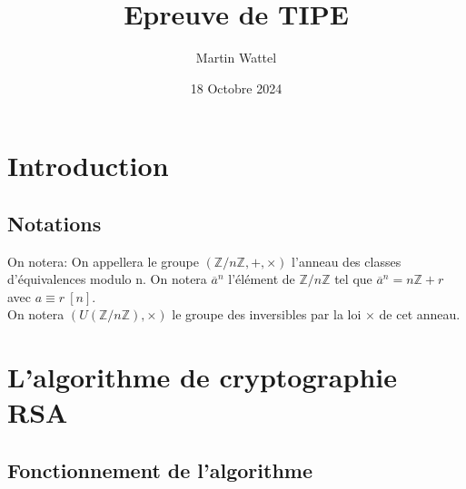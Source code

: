 \documentclass[12 pt]{article}
\title{Epreuve de TIPE}
\author{Martin Wattel}
\date{18 Octobre 2024}
\begin{document}
\maketitle

\section{Introduction}

\subsection{Notations}

On notera:
On appellera le groupe $(\mathbb{Z} / n \mathbb{Z}, +, \times)$ l'anneau des classes d'équivalences modulo n. On notera $\overline{a}^n$ l'élément de $\mathbb{Z} / n \mathbb{Z}$ tel que $\overline{a}^n = n\mathbb{Z} + r$ avec $a \equiv r ~ [n]$.\\
On notera $(U(\mathbb{Z} / n \mathbb{Z}), \times)$ le groupe des inversibles par la loi $\times$ de cet anneau.

\section{L'algorithme de cryptographie RSA}

\subsection{Fonctionnement de l'algorithme}
\end{document}
